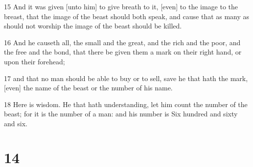 \par 15 And it was given [unto him] to give breath to it, [even] to the image to the breast, that the image of the beast should both speak, and cause that as many as should not worship the image of the beast should be killed.
\par 16 And he causeth all, the small and the great, and the rich and the poor, and the free and the bond, that there be given them a mark on their right hand, or upon their forehead;
\par 17 and that no man should be able to buy or to sell, save he that hath the mark, [even] the name of the beast or the number of his name.
\par 18 Here is wisdom. He that hath understanding, let him count the number of the beast; for it is the number of a man: and his number is Six hundred and sixty and six.

\chapter{14}

